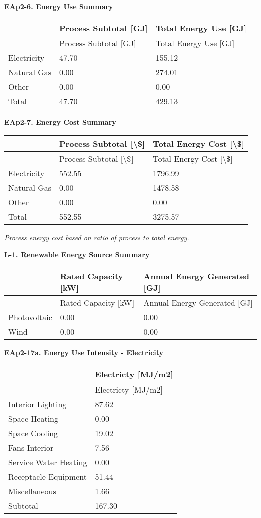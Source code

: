 \textbf{EAp2-6. Energy Use Summary}

\begin{longtable}[c]{@{}lll@{}}
\toprule 
 & Process Subtotal [GJ] & Total Energy Use [GJ] \tabularnewline
\midrule
\endfirsthead

\toprule 
 & Process Subtotal [GJ] & Total Energy Use [GJ] \tabularnewline
\midrule
\endhead

Electricity & 47.70 & 155.12 \tabularnewline
Natural Gas & 0.00 & 274.01 \tabularnewline
Other & 0.00 & 0.00 \tabularnewline
Total & 47.70 & 429.13 \tabularnewline
\bottomrule
\end{longtable}

\textbf{EAp2-7. Energy Cost Summary}

\begin{longtable}[c]{p{1.5in}p{2.21in}p{2.28in}}
\toprule 
 & Process Subtotal [\textbackslash\$] & Total Energy Cost [\textbackslash\$] \tabularnewline
\midrule
\endfirsthead

\toprule 
 & Process Subtotal [\textbackslash\$] & Total Energy Cost [\textbackslash\$] \tabularnewline
\midrule
\endhead

Electricity & 552.55 & 1796.99 \tabularnewline
Natural Gas & 0.00 & 1478.58 \tabularnewline
Other & 0.00 & 0.00 \tabularnewline
Total & 552.55 & 3275.57 \tabularnewline
\bottomrule
\end{longtable}

\emph{Process energy cost based on ratio of process to total energy.}

\textbf{L-1. Renewable Energy Source Summary}

\begin{longtable}[c]{@{}lll@{}}
\toprule 
 & Rated Capacity [kW] & Annual Energy Generated [GJ] \tabularnewline
\midrule
\endfirsthead

\toprule 
 & Rated Capacity [kW] & Annual Energy Generated [GJ] \tabularnewline
\midrule
\endhead

Photovoltaic & 0.00 & 0.00 \tabularnewline
Wind & 0.00 & 0.00 \tabularnewline
\bottomrule
\end{longtable}

\textbf{EAp2-17a. Energy Use Intensity - Electricity}

\begin{longtable}[c]{@{}ll@{}}
\toprule 
 & Electricty [MJ/m2] \tabularnewline
\midrule
\endfirsthead

\toprule 
 & Electricty [MJ/m2] \tabularnewline
\midrule
\endhead

Interior Lighting & 87.62 \tabularnewline
Space Heating & 0.00 \tabularnewline
Space Cooling & 19.02 \tabularnewline
Fans-Interior & 7.56 \tabularnewline
Service Water Heating & 0.00 \tabularnewline
Receptacle Equipment & 51.44 \tabularnewline
Miscellaneous & 1.66 \tabularnewline
Subtotal & 167.30 \tabularnewline
\bottomrule
\end{longtable}

